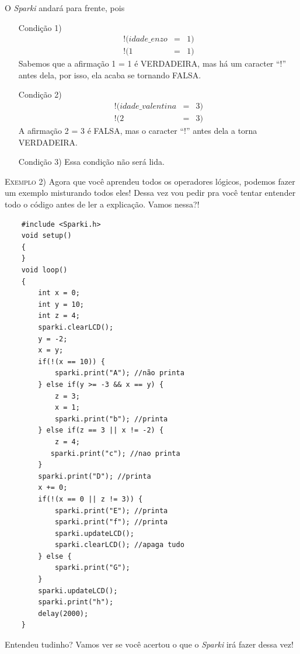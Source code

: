     O \textsl{Sparki} andará para frente, pois
    \begin{itemize}
        \item[Condição 1)]
        \begin{eqnarray}
        !(idade\_enzo & = & 1)\\
        !(1 & = & 1) \nonumber         \end{eqnarray}
        Sabemos que a afirmação 1 = 1 é VERDADEIRA, mas há um caracter ``!'' antes dela, por isso, ela acaba se tornando FALSA.
        \item[Condição 2)]
        \begin{eqnarray}
        !(idade\_valentina & = & 3)\\
        !(2 & = & 3) \nonumber
        \end{eqnarray}
        A afirmação 2 = 3 é FALSA, mas o caracter ``!'' antes dela a torna VERDADEIRA.
        \item[Condição 3)] Essa condição não será lida.
    \end{itemize}
    
     \textsc{Exemplo 2)} Agora que você aprendeu todos os operadores lógicos, podemos fazer um exemplo misturando todos eles! Dessa vez vou pedir pra você tentar entender todo o código antes de ler a explicação. Vamos nessa?!
     
     \begin{verbatim}
    #include <Sparki.h>
    void setup()
    {
    }
    void loop()
    {
        int x = 0;
        int y = 10;
        int z = 4;
        sparki.clearLCD();
        y = -2;
        x = y;
        if(!(x == 10)) {
            sparki.print("A"); //não printa
        } else if(y >= -3 && x == y) {
            z = 3;
            x = 1;
            sparki.print("b"); //printa
        } else if(z == 3 || x != -2) {
            z = 4;
           sparki.print("c"); //nao printa
        }
        sparki.print("D"); //printa
        x += 0;
        if(!(x == 0 || z != 3)) {
            sparki.print("E"); //printa
            sparki.print("f"); //printa
            sparki.updateLCD();
            sparki.clearLCD(); //apaga tudo
        } else {
            sparki.print("G");
        }
        sparki.updateLCD();
        sparki.print("h");
        delay(2000);
    }
    \end{verbatim}
     
    Entendeu tudinho? Vamos ver se você acertou o que o \textsl{Sparki} irá fazer dessa vez!
    
    
    
